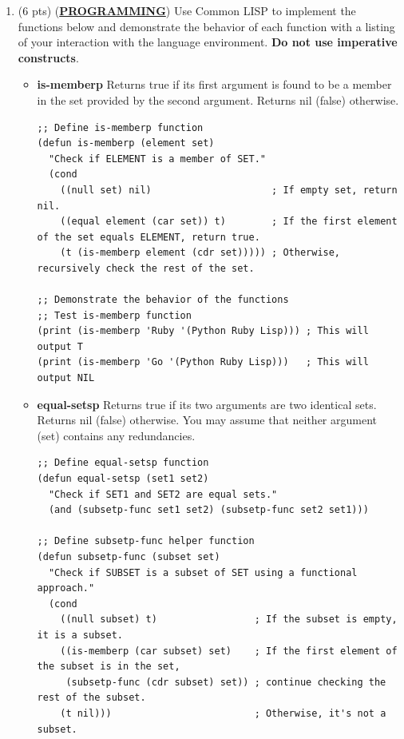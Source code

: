 \documentclass[12pt]{article}
\begin{document}
\begin{spacing}{1.5}
\begin{enumerate}
		\item (6 pts) (\textbf{\uline{{PROGRAMMING}}}) Use Common LISP to implement the functions below and demonstrate the behavior of each function with a listing of your interaction with the language environment. \textbf{Do not use imperative constructs}.
		      		      		      		      
		      \begin{itemize}
		      	\item \textbf{is-memberp} Returns true if its first argument is found to be a member in the set provided by the second argument. Returns nil (false) otherwise.
		      	      		      	      		      	      		      	      
		      	      \begin{lstlisting}
;; Define is-memberp function
(defun is-memberp (element set)
  "Check if ELEMENT is a member of SET."
  (cond
    ((null set) nil)                     ; If empty set, return nil.
    ((equal element (car set)) t)        ; If the first element of the set equals ELEMENT, return true.
    (t (is-memberp element (cdr set))))) ; Otherwise, recursively check the rest of the set.

;; Demonstrate the behavior of the functions
;; Test is-memberp function
(print (is-memberp 'Ruby '(Python Ruby Lisp))) ; This will output T
(print (is-memberp 'Go '(Python Ruby Lisp)))   ; This will output NIL
		      	      \end{lstlisting}
		      	      		      	      		      	      		      	      
		      	      		      	      		      	      		      	      
		      	      		      	      		      	      		      	                      
		      	\item \textbf{equal-setsp} Returns true if its two arguments are two identical sets. Returns nil (false) otherwise. You may assume that neither argument (set) contains any redundancies.
		      	      		      	      		      	      		      	      
		      	      \begin{lstlisting}
;; Define equal-setsp function
(defun equal-setsp (set1 set2)
  "Check if SET1 and SET2 are equal sets."
  (and (subsetp-func set1 set2) (subsetp-func set2 set1)))

;; Define subsetp-func helper function
(defun subsetp-func (subset set)
  "Check if SUBSET is a subset of SET using a functional approach."
  (cond
    ((null subset) t)                 ; If the subset is empty, it is a subset.
    ((is-memberp (car subset) set)    ; If the first element of the subset is in the set,
     (subsetp-func (cdr subset) set)) ; continue checking the rest of the subset.
    (t nil)))                         ; Otherwise, it's not a subset.


\end{lstlisting}
\end{itemize}
\end{enumerate}
\end{spacing}
\end{document}
